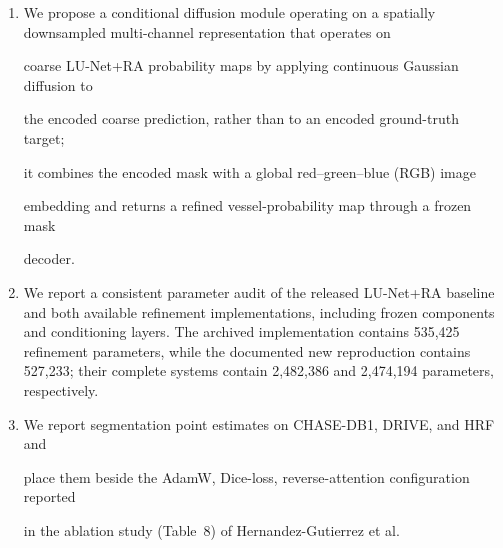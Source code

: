 \documentclass[jimaging,article,submit,pdftex,moreauthors]{Definitions/mdpi}%
\begin{document}
\begin{enumerate}




  \item We propose a conditional diffusion module operating on a spatially downsampled multi-channel representation that operates on

coarse LU-Net+RA probability maps by applying continuous Gaussian diffusion to

the encoded coarse prediction, rather than to an encoded ground-truth target;

it combines the encoded mask with a global red--green--blue (RGB) image

embedding and returns a refined vessel-probability map through a frozen mask

decoder.



  \item We report a consistent parameter audit of the released LU-Net+RA baseline and both available refinement implementations, including frozen components and conditioning layers. The archived implementation contains 535,425 refinement parameters, while the documented new reproduction contains 527,233; their complete systems contain 2,482,386 and 2,474,194 parameters, respectively.




  \item We report segmentation point estimates on CHASE-DB1, DRIVE, and HRF and

place them beside the AdamW, Dice-loss, reverse-attention configuration reported

in the ablation study (Table~8) of Hernandez-Gutierrez et al.~\cite{Hernandez2025}


\end{enumerate}
\end{document}
